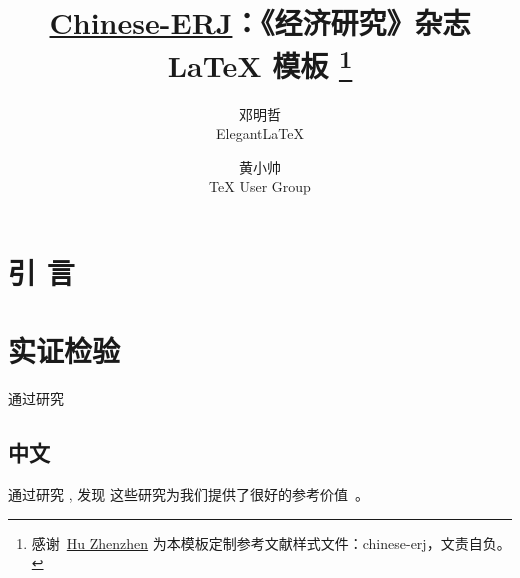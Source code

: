 \documentclass{chinese-erj}
\title{\href{https://github.com/EthanDeng/Chinese-ERJ}{Chinese-ERJ}：《经济研究》杂志 \LaTeX{} 模板 \thanks{感谢~\href{https://github.com/hushidong}{Hu Zhenzhen} 为本模板定制参考文献样式文件：chinese-erj，文责自负。}}
\author{邓明哲\\ Elegant\LaTeX{} \and 黄小帅 \\ \TeX{} User Group}
\date{}
\begin{document}
\maketitle

\begin{abstract}
\zhlipsum*[5]
\end{abstract}

\section{引   言}
\zhlipsum[2-6]

\section{实证检验}
\zhlipsum[7-10] 通过研究 \cite{zheng2012nascent} \textcite{zheng2012nascent}

\subsection{中文}
\textcite{cn1} 通过研究 \zhlipsum*[1], \textcite{cn2,cn3} 发现 \zhlipsum*[2] 这些研究为我们提供了很好的参考价值~\cite{en1,en2,en3}。

\nocite{*}
\erjref
\printbibliography[heading=none]
\enmaketitle
\end{document}
